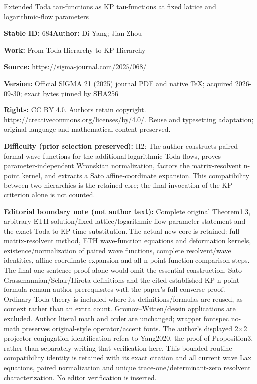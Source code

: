 \documentclass[11pt]{article}
\numberwithin{equation}{section}
\numberwithin{equation}{section}
\begin{document}
\begin{center}\Large Extended Toda tau-functions as KP tau-functions at fixed lattice and logarithmic-flow parameters\end{center}
\noindent\textbf{Stable ID:} 684\quad\textbf{Author:} Di Yang; Jian Zhou\par
\noindent\textbf{Work:} From Toda Hierarchy to KP Hierarchy\par
\noindent\textbf{Source:} \url{https://sigma-journal.com/2025/068/}\par
\noindent\textbf{Version:} Official SIGMA 21 (2025) journal PDF and native TeX; acquired 2026-09-30; exact bytes pinned by SHA256\par
\noindent\textbf{Rights:} CC BY 4.0. Authors retain copyright. \url{https://creativecommons.org/licenses/by/4.0/}. Reuse and typesetting adaptation; original language and mathematical content preserved.\par
\noindent\textbf{Difficulty (prior selection preserved):} {\CJKfont H2: The author constructs paired formal wave functions for the additional logarithmic Toda flows, proves parameter-independent Wronskian normalization, factors the matrix-resolvent n-point kernel, and extracts a Sato affine-coordinate expansion. This compatibility between two hierarchies is the retained core; the final invocation of the KP criterion alone is not counted.}\par
\medskip\noindent\textbf{Editorial boundary note (not author text):} Complete original Theorem1.3, arbitrary ETH solution/fixed lattice/logarithmic-flow parameter statement and the exact Toda-to-KP time substitution. The actual new core is retained: full matrix-resolvent method, ETH wave-function equations and deformation kernels, existence/normalization of paired wave functions, complete resolvent/wave identities, affine-coordinate expansion and all n-point-function comparison steps. The final one-sentence proof alone would omit the essential construction. Sato-Grassmannian/Schur/Hirota definitions and the cited established KP n-point formula remain author prerequisites with the paper’s full converse proof. Ordinary Toda theory is included where its definitions/formulas are reused, as context rather than an extra count. Gromov–Witten/dessin applications are excluded. Author literal math and order are unchanged; wrapper fontspec no-math preserves original-style operator/accent fonts. The author’s displayed 2×2 projector-conjugation identification refers to Yang2020, the proof of Proposition3, rather than separately writing that verification here. This bounded routine compatibility identity is retained with its exact citation and all current wave Lax equations, paired normalization and unique trace-one/determinant-zero resolvent characterization. No editor verification is inserted.\par
\end{document}
